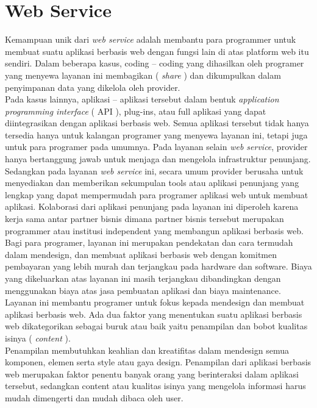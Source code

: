 \section{Web Service}
\tab Kemampuan unik dari \textit{web service} adalah membantu para programmer untuk membuat suatu aplikasi berbasis web dengan fungsi lain di atas platform web itu sendiri. Dalam beberapa kasus, coding – coding yang dihasilkan oleh programer yang menyewa layanan ini membagikan ( \textit{share} ) dan dikumpulkan dalam penyimpanan data yang dikelola oleh provider.\\
\tab Pada kasus lainnya, aplikasi – aplikasi tersebut dalam bentuk \textit{application programming interface} ( API ), plug-ins, atau full aplikasi yang dapat diintegrasikan dengan aplikasi berbasis web. Semua aplikasi tersebut tidak hanya tersedia hanya untuk kalangan programer yang menyewa layanan ini, tetapi juga untuk para programer pada umumnya.
\tab Pada layanan selain \textit{web service}, provider hanya bertanggung jawab untuk menjaga dan mengelola infrastruktur penunjang. Sedangkan pada layanan \textit{web service} ini, secara umum provider berusaha untuk menyediakan dan memberikan sekumpulan tools atau aplikasi penunjang yang lengkap yang dapat mempermudah para programer aplikasi web untuk membuat aplikasi. Kolaborasi dari aplikasi penunjang pada layanan ini diperoleh karena kerja sama antar partner bisnis dimana partner bisnis tersebut merupakan programmer atau institusi independent yang membangun aplikasi berbasis web.\\
\tab Bagi para programer, layanan ini merupakan pendekatan dan cara termudah dalam mendesign, dan membuat aplikasi berbasis web dengan komitmen pembayaran yang lebih murah dan terjangkau pada hardware dan software. Biaya yang dikeluarkan atas layanan ini masih terjangkau dibandingkan dengan menggunakan biaya atas jasa pembuatan aplikasi dan biaya maintenance.\\
\tab Layanan ini membantu programer untuk fokus kepada mendesign dan membuat aplikasi berbasis web. Ada dua faktor yang menentukan suatu aplikasi berbasis web dikategorikan sebagai buruk atau baik yaitu penampilan dan bobot kualitas isinya ( \textit{content} ).\\
\tab Penampilan membutuhkan keahlian dan kreatifitas dalam mendesign semua komponen, elemen serta style atau gaya design. Penampilan dari aplikasi berbasis web merupakan faktor penentu banyak orang yang berinteraksi dalam aplikasi tersebut, sedangkan content atau kualitas isinya yang mengelola informasi harus mudah dimengerti dan mudah dibaca oleh user.\\
